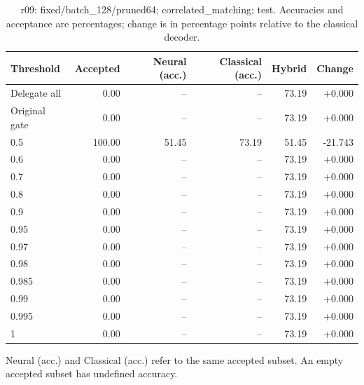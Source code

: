 \begin{table}[htbp]
\centering\small
\setlength{\tabcolsep}{3pt}
\caption{r09: fixed/batch\_128/pruned64; correlated\_matching; test. Accuracies and acceptance are percentages; change is in percentage points relative to the classical decoder.}
\begin{tabular}{lrrrrr}
\toprule
Threshold & Accepted & Neural (acc.) & Classical (acc.) & Hybrid & Change \\
\midrule
Delegate all & 0.00 & -- & -- & 73.19 & +0.000 \\
Original gate & 0.00 & -- & -- & 73.19 & +0.000 \\
0.5 & 100.00 & 51.45 & 73.19 & 51.45 & -21.743 \\
0.6 & 0.00 & -- & -- & 73.19 & +0.000 \\
0.7 & 0.00 & -- & -- & 73.19 & +0.000 \\
0.8 & 0.00 & -- & -- & 73.19 & +0.000 \\
0.9 & 0.00 & -- & -- & 73.19 & +0.000 \\
0.95 & 0.00 & -- & -- & 73.19 & +0.000 \\
0.97 & 0.00 & -- & -- & 73.19 & +0.000 \\
0.98 & 0.00 & -- & -- & 73.19 & +0.000 \\
0.985 & 0.00 & -- & -- & 73.19 & +0.000 \\
0.99 & 0.00 & -- & -- & 73.19 & +0.000 \\
0.995 & 0.00 & -- & -- & 73.19 & +0.000 \\
1 & 0.00 & -- & -- & 73.19 & +0.000 \\
\bottomrule
\end{tabular}
\par\smallskip\footnotesize Neural (acc.) and Classical (acc.) refer to the same accepted subset. An empty accepted subset has undefined accuracy.
\end{table}
